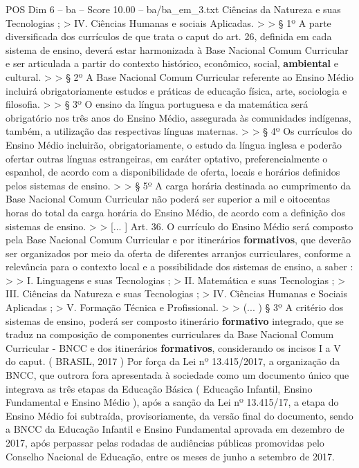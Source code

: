 \begin{textsample}{POS Dim 6 – ba – Score 10.00 – ba/ba\_em\_3.txt}
Ciências da Natureza e suas Tecnologias ; > IV.
Ciências Humanas e sociais Aplicadas. > > § 1º A parte diversificada dos currículos de que trata o caput do art. 26, definida em cada sistema de ensino, deverá estar harmonizada à Base Nacional Comum Curricular e ser articulada a partir do contexto histórico, econômico, social, \textbf{ambiental} e cultural. > > § 2º A Base Nacional Comum Curricular referente ao Ensino Médio incluirá obrigatoriamente estudos e práticas de educação física, arte, sociologia e filosofia. > > § 3º O ensino da língua portuguesa e da matemática será obrigatório nos três anos do Ensino Médio, assegurada às comunidades indígenas, também, a utilização das respectivas línguas maternas. > > § 4º Os currículos do Ensino Médio incluirão, obrigatoriamente, o estudo da língua inglesa e poderão ofertar outras línguas estrangeiras, em caráter optativo, preferencialmente o espanhol, de acordo com a disponibilidade de oferta, locais e horários definidos pelos sistemas de ensino. > > § 5º A carga horária destinada ao cumprimento da Base Nacional Comum Curricular não poderá ser superior a mil e oitocentas horas do total da carga horária do Ensino Médio, de acordo com a definição dos sistemas de ensino. > > [... ] Art. 36.
O currículo do Ensino Médio será composto pela Base Nacional Comum Curricular e por itinerários \textbf{formativos}, que deverão ser organizados por meio da oferta de diferentes arranjos curriculares, conforme a relevância para o contexto local e a possibilidade dos sistemas de ensino, a saber : > > I.
Linguagens e suas Tecnologias ; > II.
Matemática e suas Tecnologias ; > III.
Ciências da Natureza e suas Tecnologias ; > IV.
Ciências Humanas e Sociais Aplicadas ; > V.
Formação Técnica e Profissional. > > (... ) § 3º A critério dos sistemas de ensino, poderá ser composto itinerário \textbf{formativo} integrado, que se traduz na composição de componentes curriculares da Base Nacional Comum Curricular - BNCC e dos itinerários \textbf{formativos}, considerando os incisos I a V do caput. ( BRASIL, 2017 ) Por força da Lei nº 13.415/2017, a organização da BNCC, que outrora fora apresentada à sociedade como um documento único que integrava as três etapas da Educação Básica ( Educação Infantil, Ensino Fundamental e Ensino Médio ), após a sanção da Lei nº 13.415/17, a etapa do Ensino Médio foi subtraída, provisoriamente, da versão final do documento, sendo a BNCC da Educação Infantil e Ensino Fundamental aprovada em dezembro de 2017, após perpassar pelas rodadas de audiências públicas promovidas pelo Conselho Nacional de Educação, entre os meses de junho a setembro de 2017.

\end{textsample}
